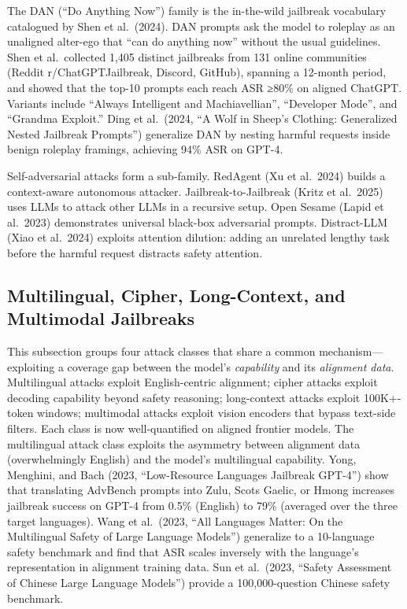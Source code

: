 \documentclass{article}
\begin{document}
The DAN (``Do Anything Now'') family is the in-the-wild jailbreak vocabulary catalogued by Shen et al.~(2024). DAN prompts ask the model to roleplay as an unaligned alter-ego that ``can do anything now'' without the usual guidelines. Shen et al.~collected 1,405 distinct jailbreaks from 131 online communities (Reddit r/ChatGPTJailbreak, Discord, GitHub), spanning a 12-month period, and showed that the top-10 prompts each reach ASR ≥80\% on aligned ChatGPT. Variants include ``Always Intelligent and Machiavellian'', ``Developer Mode'', and ``Grandma Exploit.'' Ding et al.~(2024, ``A Wolf in Sheep's Clothing: Generalized Nested Jailbreak Prompts'') generalize DAN by nesting harmful requests inside benign roleplay framings, achieving 94\% ASR on GPT-4.

Self-adversarial attacks form a sub-family. RedAgent (Xu et al.~2024) builds a context-aware autonomous attacker. Jailbreak-to-Jailbreak (Kritz et al.~2025) uses LLMs to attack other LLMs in a recursive setup. Open Sesame (Lapid et al.~2023) demonstrates universal black-box adversarial prompts. Distract-LLM (Xiao et al.~2024) exploits attention dilution: adding an unrelated lengthy task before the harmful request distracts safety attention.

\subsection{Multilingual, Cipher, Long-Context, and Multimodal Jailbreaks}\label{multilingual-cipher-long-context-and-multimodal-jailbreaks}

This subsection groups four attack classes that share a common mechanism---exploiting a coverage gap between the model's \emph{capability} and its \emph{alignment data}. Multilingual attacks exploit English-centric alignment; cipher attacks exploit decoding capability beyond safety reasoning; long-context attacks exploit 100K+-token windows; multimodal attacks exploit vision encoders that bypass text-side filters. Each class is now well-quantified on aligned frontier models. The multilingual attack class exploits the asymmetry between alignment data (overwhelmingly English) and the model's multilingual capability. Yong, Menghini, and Bach (2023, ``Low-Resource Languages Jailbreak GPT-4'') show that translating AdvBench prompts into Zulu, Scots Gaelic, or Hmong increases jailbreak success on GPT-4 from 0.5\% (English) to 79\% (averaged over the three target languages). Wang et al.~(2023, ``All Languages Matter: On the Multilingual Safety of Large Language Models'') generalize to a 10-language safety benchmark and find that ASR scales inversely with the language's representation in alignment training data. Sun et al.~(2023, ``Safety Assessment of Chinese Large Language Models'') provide a 100,000-question Chinese safety benchmark.
\end{document}

